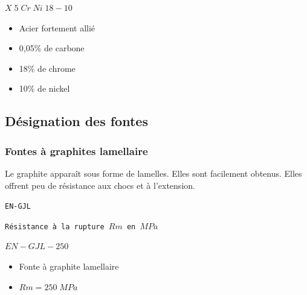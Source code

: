 \documentclass[11pt,oneside]{article}
\begin{document}
\begin{exemple}
\begin{minipage}[c]{.3\linewidth}
\begin{center}
$ X\; 5\;  Cr\; Ni\; 18-10$
\end{center}
\end{minipage} \hfill
\begin{minipage}[c]{.6\linewidth}
\begin{itemize}
\item Acier fortement allié
\item 0,05\% de carbone
\item 18\% de chrome 
\item 10\% de nickel
\end{itemize}
\end{minipage}
\end{exemple}

\subsection{Désignation des fontes}

\subsubsection{Fontes à graphites lamellaire}

\begin{resultat}
Le graphite apparaît sous forme de lamelles. Elles sont facilement obtenus. Elles offrent peu de résistance aux chocs et à l'extension.


\begin{minipage}[c]{.3\linewidth}
\begin{center}
\texttt{EN-GJL}
\end{center}
\end{minipage} \hfill
\begin{minipage}[c]{.5\linewidth}
\begin{center}
\texttt{Résistance à la rupture $Rm$ en $MPa$}
\end{center}
\end{minipage} 
\end{resultat}


\begin{exemple}
\begin{minipage}[c]{.3\linewidth}
\begin{center}
$ EN-GJL-250$
\end{center}
\end{minipage} \hfill
\begin{minipage}[c]{.6\linewidth}
\begin{itemize}
\item Fonte à graphite lamellaire
\item $Rm = 250\; MPa$
\end{itemize}
\end{minipage}
\end{exemple}
\end{document}
